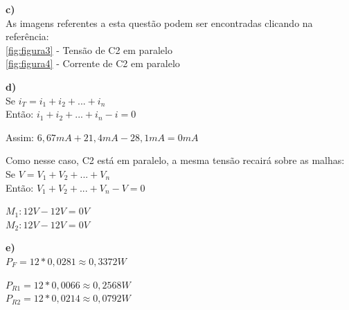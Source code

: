 \documentclass[
		12pt, %
		oneside, %
		a4paper, %
		article, %
		chapter=TITLE, %
		section=TITLE, %
		subsection=TITLE, %
		english, %
		spanish, %
		brazil %
]{abntex2} %
\numberwithin{equation}{section}
\numberwithin{figure}{section}
\numberwithin{table}{section}
\begin{document}
	\textbf{c)} \\
	As imagens referentes a esta questão podem ser encontradas clicando na referência: \\
	\ref{fig:figura3} - Tensão de C2 em paralelo \\
	\ref{fig:figura4} - Corrente de C2 em paralelo
	\linebreak

	\textbf{d)} \\
	Se $i_T = i_1 + i_2 + ... + i_n$ \\
	Então: $i_1 + i_2 + ... + i_n - i = 0$

	Assim: $6,67mA + 21,4mA - 28,1mA = 0mA$

	Como nesse caso, C2 está em paralelo, a mesma tensão recairá sobre as malhas: \\
	Se $V = V_1 + V_2 + ... + V_n$ \\
	Então: $V_1 + V_2 + ... + V_n - V = 0$

	$M_1: 12V - 12V = 0V$ \\
	$M_2: 12V - 12V = 0V$
	\linebreak

	\textbf{e)} \\
	$P_F = 12 * 0,0281 \approx 0,3372 W$

	$P_{R1} = 12 * 0,0066 \approx 0,2568 W$ \\
	$P_{R2} = 12 * 0,0214 \approx 0,0792 W$


	\newpage
\end{document}
